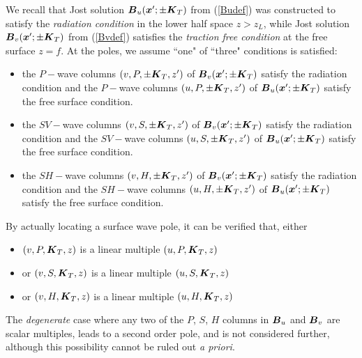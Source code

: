 We recall that Jost solution ${\bmi B}_{u}({\bmi x}^{\prime};\pm{\bmi K}_{T})$ 
from (\ref{Budef})  
was constructed to satisfy the {\em 
radiation condition\/} in the lower half space $z> z_L$, while 
Jost solution ${\bmi B}_{v}({\bmi x}^{\prime};\pm{\bmi K}_{T})$ from 
(\ref{Bvdef}) satisfies the {\em traction free condition\/} 
at the free surface $z=f$. At the poles, we assume ``one" of ``three" conditions is 
satisfied:
\begin{itemize}
\item the $P-$wave columns $(v,P,\pm{\bmi K}_{T}, z^{\prime})$ of 
${\bmi B}_{v}({\bmi x}^{\prime};\pm{\bmi K}_{T})$ satisfy the 
radiation condition
and the $P-$wave columns $(u,P,\pm{\bmi K}_{T}, z^{\prime})$ of 
${\bmi B}_{u}({\bmi x}^{\prime};\pm{\bmi K}_{T})$ satisfy the 
free surface condition.

\item the $SV-$wave columns $(v,S,\pm{\bmi K}_{T}, z^{\prime})$ of 
${\bmi B}_{v}({\bmi x}^{\prime};\pm{\bmi K}_{T})$ satisfy the 
radiation condition
and the $SV-$wave columns $(u,S,\pm{\bmi K}_{T}, z^{\prime})$ of 
${\bmi B}_{u}({\bmi x}^{\prime};\pm{\bmi K}_{T})$ satisfy the 
free surface condition.

\item the $SH-$wave columns $(v,H,\pm{\bmi K}_{T}, z^{\prime})$ of 
${\bmi B}_{v}({\bmi x}^{\prime};\pm{\bmi K}_{T})$ satisfy the 
radiation condition
and the $SH-$wave columns $(u,H,\pm{\bmi K}_{T}, z^{\prime})$ of 
${\bmi B}_{u}({\bmi x}^{\prime};\pm{\bmi K}_{T})$ satisfy the 
free surface condition.

\end{itemize}
By actually locating a surface wave pole, it can be verified that, either
\begin{itemize}
\item $(v,P,{\bmi K}_{T},z)$ is a linear multiple $(u,P,{\bmi K}_{T},z)$ 
\item or $(v,S,{\bmi K}_{T},z)$ is a linear multiple $(u,S,{\bmi K}_{T},z)$ 
\item or $(v,H,{\bmi K}_{T},z)$ is a linear multiple $(u,H,{\bmi K}_{T},z)$
\end{itemize}
The {\em degenerate\/} case where any two of the $P$, $S$, $H$ columns in 
${\bmi B}_{u}$ and ${\bmi  B}_{v}$ are scalar multiples, leads to a 
second order pole, and is not considered further, although this 
possibility cannot be ruled out {\em a priori\/}.



